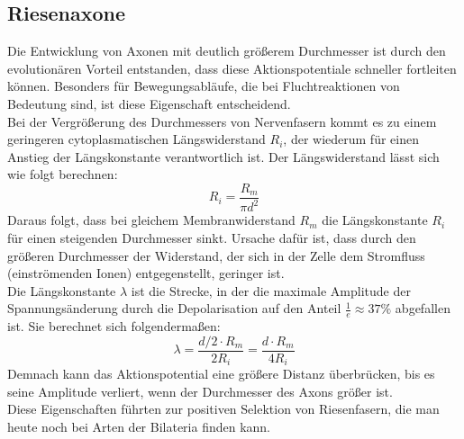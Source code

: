 \documentclass[11pt]{article}
\begin{document}
\subsection{Riesenaxone}
Die Entwicklung von Axonen mit deutlich größerem Durchmesser ist durch den evolutionären Vorteil entstanden, dass diese Aktionspotentiale schneller fortleiten können. Besonders für Bewegungsabläufe, die bei Fluchtreaktionen von Bedeutung sind, ist diese Eigenschaft entscheidend. \\
Bei der Vergrößerung des Durchmessers von Nervenfasern kommt es zu einem geringeren cytoplasmatischen Längswiderstand $R_i$, der wiederum für einen Anstieg der Längskonstante verantwortlich ist. Der Längswiderstand lässt sich wie folgt berechnen:
\begin{equation}
\label{eq1}
R_i = \dfrac{R_m}{\pi d^2}
\end{equation}
Daraus folgt, dass bei gleichem Membranwiderstand $R_m$ die Längskonstante $R_i$ für einen steigenden Durchmesser sinkt. Ursache dafür ist, dass durch den größeren Durchmesser der Widerstand, der sich in der Zelle dem Stromfluss (einströmenden Ionen) entgegenstellt, geringer ist. \\
Die Längskonstante $\lambda$ ist die Strecke, in der die maximale Amplitude der Spannungsänderung durch die Depolarisation auf den Anteil $\frac{1}{e} \approx 37\%$ abgefallen ist.  \cite{physiologie} Sie berechnet sich folgendermaßen:
\begin{equation}
\label{eq2}
\lambda = \dfrac{d/2 \cdot R_m}{2 R_i} = \dfrac{d \cdot R_m}{4 R_i}
\end{equation}
Demnach kann das Aktionspotential eine größere Distanz überbrücken, bis es seine Amplitude verliert, wenn der Durchmesser des Axons größer ist. \\
Diese Eigenschaften führten zur positiven Selektion von Riesenfasern, die man heute noch bei Arten der Bilateria finden kann. 
\end{document}
